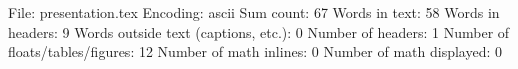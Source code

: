 File: presentation.tex
Encoding: ascii
Sum count: 67
Words in text: 58
Words in headers: 9
Words outside text (captions, etc.): 0
Number of headers: 1
Number of floats/tables/figures: 12
Number of math inlines: 0
Number of math displayed: 0

